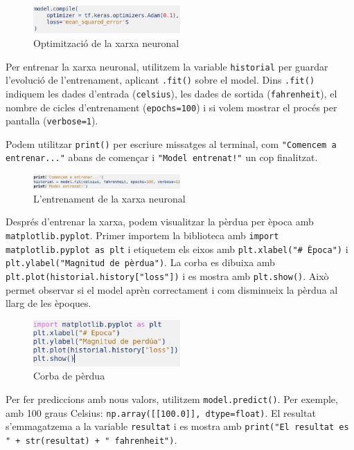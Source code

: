 \begin{figure}[H]
\centering
\includegraphics[width=0.5\textwidth]{./figures/4.png}
\caption{Optimització de la xarxa neuronal}
\end{figure}

Per entrenar la xarxa neuronal, utilitzem la variable \texttt{historial} per guardar l’evolució de l’entrenament, aplicant \texttt{.fit()} sobre el model. Dins \texttt{.fit()} indiquem les dades d’entrada (\texttt{celsius}), les dades de sortida (\texttt{fahrenheit}), el nombre de cicles d’entrenament (\texttt{epochs=100}) i si volem mostrar el procés per pantalla (\texttt{verbose=1}).

Podem utilitzar \texttt{print()} per escriure missatges al terminal, com \texttt{"Comencem a entrenar..."} abans de començar i \texttt{"Model entrenat!"} un cop finalitzat.

\begin{figure}[H]
\centering
\includegraphics[width=0.5\textwidth]{./figures/6.png}
\caption{L’entrenament de la xarxa neuronal}
\end{figure}

Després d’entrenar la xarxa, podem visualitzar la pèrdua per època amb \texttt{matplotlib.pyplot}. Primer importem la biblioteca amb \texttt{import matplotlib.pyplot as plt} i etiquetem els eixos amb \texttt{plt.xlabel("\# Època")} i \texttt{plt.ylabel("Magnitud de pèrdua")}. La corba es dibuixa amb \texttt{plt.plot(historial.history["loss"])} i es mostra amb \texttt{plt.show()}. Això permet observar si el model aprèn correctament i com disminueix la pèrdua al llarg de les èpoques.

\begin{figure}[H]
\centering
\includegraphics[width=0.5\textwidth]{./figures/7.png}
\caption{Corba de pèrdua}
\end{figure}

Per fer prediccions amb nous valors, utilitzem \texttt{model.predict()}. Per exemple, amb 100 graus Celsius: \texttt{np.array([[100.0]], dtype=float)}. El resultat s’emmagatzema a la variable \texttt{resultat} i es mostra amb \texttt{print("El resultat es " + str(resultat) + " fahrenheit")}.

